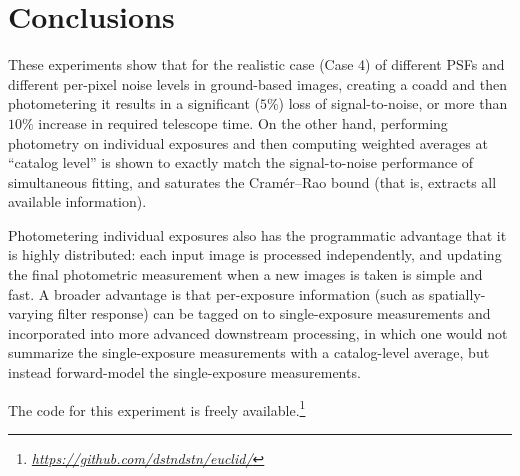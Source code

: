 \documentclass[a4paper,11pt]{article}
\newcommand{\niceurl}[1]{\href{#1}{\textsl{#1}}}
\begin{document}
\newpage
\section*{Conclusions}

These experiments show that for the realistic case (Case 4) of
different PSFs and different per-pixel noise levels in ground-based
images, creating a coadd and then photometering it results in a
significant ($5\%$) loss of signal-to-noise, or more than $10\%$
increase in required telescope time.  On the other hand, performing
photometry on individual exposures and then computing weighted
averages at ``catalog level'' is shown to exactly match the
signal-to-noise performance of simultaneous fitting, and saturates the
Cram\'er--Rao bound (that is, extracts all available information).

Photometering individual exposures also has the programmatic advantage
that it is highly distributed: each input image is processed
independently, and updating the final photometric measurement when a
new images is taken is simple and fast.  A broader advantage is that
per-exposure information (such as spatially-varying filter response)
can be tagged on to single-exposure measurements and incorporated into
more advanced downstream processing, in which one would not summarize
the single-exposure measurements with a catalog-level average, but
instead forward-model the single-exposure measurements.

The code for this experiment is freely available.\footnote{%
  \niceurl{https://github.com/dstndstn/euclid/}}
\end{document}
